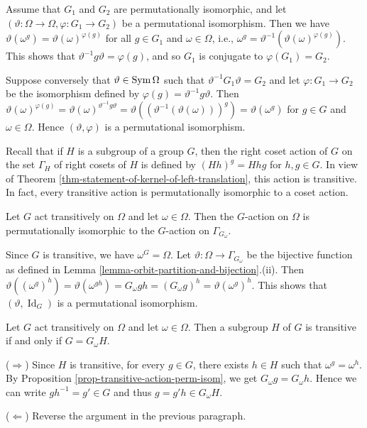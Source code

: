 \begin{sketch}
	Assume that $G_1$ and $G_2$ are permutationally isomorphic, and let $(\vartheta:\Omega\to \Omega, \varphi:G_1\rightarrow G_2)$ be a permutational isomorphism. Then we have $\vartheta(\omega^g) = \vartheta(\omega)^{\varphi(g)}$ for all $g \in G_1$ and $\omega \in \Omega$, i.e., $\omega^g = \vartheta^{-1}(\vartheta(\omega)^{\varphi(g)})$. This shows that $\vartheta^{-1}g\vartheta = \varphi(g)$, and so $G_1$ is conjugate to $\varphi(G_1) = G_2$.
	
	Suppose conversely that $\vartheta \in \operatorname{Sym}\Omega$ such that $\vartheta^{-1}G_1\vartheta = G_2$ and let $\varphi: G_1 \to G_2$ be the isomorphism defined by  $\varphi(g) = \vartheta^{-1}g\vartheta$. Then  $\vartheta(\omega)^{\varphi(g)} = \vartheta(\omega)^{\vartheta^{-1}g\vartheta} = \vartheta((\vartheta^{-1}(\vartheta(\omega)))^{g}) = \vartheta(\omega^g)$ for $g \in G$ and $\omega \in \Omega$. Hence $(\vartheta, \varphi)$ is a permutational isomorphism.
\end{sketch}

 Recall that if $H$ is a subgroup of  a group $G$, then the right coset action of $G$ on the set $\Gamma_H$ of right cosets of $H$  is defined by $(Hh)^g  = Hhg$ for $h,g\in G$. In view of Theorem \ref{thm-statement-of-kernel-of-left-translation}, this action is transitive. In fact, every transitive action is permutationally isomorphic to a coset action. 
\begin{proposition} \label{prop-transitive-action-perm-isom}
	Let $G$ act transitively on $\Omega$ and let $\omega\in \Omega$. Then the $G$-action on $\Omega$ is permutationally isomorphic to the $G$-action on $\Gamma_{G_\omega}$.
\end{proposition}
\begin{sketch}
	Since $G$ is transitive, we have $\omega^G = \Omega$. Let $\vartheta:\Omega \rightarrow \Gamma_{G_\omega}$ be the bijective function as defined in Lemma \ref{lemma-orbit-partition-and-bijection}.(ii). Then $\vartheta((\omega^g)^h) = \vartheta(\omega^{gh}) = G_\omega gh = (G_\omega g)^h = \vartheta(\omega^g)^h$. This shows that $(\vartheta,\operatorname{Id}_G)$ is a permutational isomorphism.
\end{sketch}

\begin{corollary}
	Let $G$ act transitively on $\Omega$ and let $\omega\in\Omega$. Then a subgroup $H$ of $G$ is transitive if and only if $G = G_\omega H$.
\end{corollary}
\begin{sketch}
	($\Rightarrow$) Since $H$ is transitive, for every $g\in G$, there exists $h\in H$ such that $\omega^g = \omega^h$. By Proposition \ref{prop-transitive-action-perm-isom}, we get $G_\omega g = G_\omega h$. Hence we can write $gh^{-1} = g'\in G$ and thus $g = g'h\in G_\omega H$.
	
	($\Leftarrow$) Reverse the argument in the previous paragraph.
\end{sketch}

